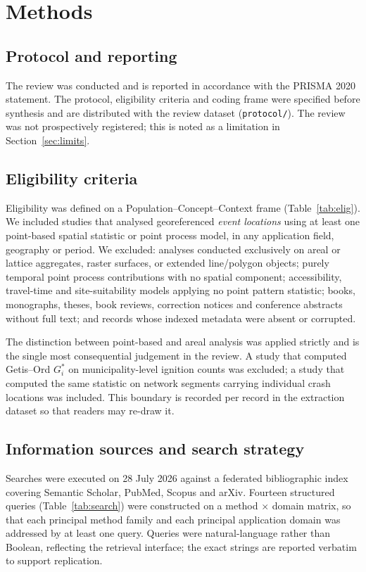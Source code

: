 \documentclass[11pt,a4paper]{article}
\begin{document}
\section{Methods}

\subsection{Protocol and reporting}
The review was conducted and is reported in accordance with the PRISMA 2020
statement. The protocol, eligibility criteria and coding frame were specified
before synthesis and are distributed with the review dataset
(\texttt{protocol/}). The review was not prospectively registered; this is
noted as a limitation in Section~\ref{sec:limits}.

\subsection{Eligibility criteria}
Eligibility was defined on a Population--Concept--Context frame
(Table~\ref{tab:elig}). We included studies that analysed georeferenced
\emph{event locations} using at least one point-based spatial statistic or
point process model, in any application field, geography or period. We
excluded: analyses conducted exclusively on areal or lattice aggregates,
raster surfaces, or extended line/polygon objects; purely temporal point
process contributions with no spatial component; accessibility, travel-time
and site-suitability models applying no point pattern statistic; books,
monographs, theses, book reviews, correction notices and conference abstracts
without full text; and records whose indexed metadata were absent or
corrupted.

The distinction between point-based and areal analysis was applied strictly
and is the single most consequential judgement in the review. A study that
computed Getis--Ord $G_i^*$ on municipality-level ignition counts was
excluded; a study that computed the same statistic on network segments
carrying individual crash locations was included. This boundary is recorded
per record in the extraction dataset so that readers may re-draw it.

\subsection{Information sources and search strategy}
Searches were executed on 28 July 2026 against a federated bibliographic index
covering Semantic Scholar, PubMed, Scopus and arXiv. Fourteen structured
queries (Table~\ref{tab:search}) were constructed on a method $\times$ domain
matrix, so that each principal method family and each principal application
domain was addressed by at least one query. Queries were natural-language
rather than Boolean, reflecting the retrieval interface; the exact strings are
reported verbatim to support replication.
\end{document}
